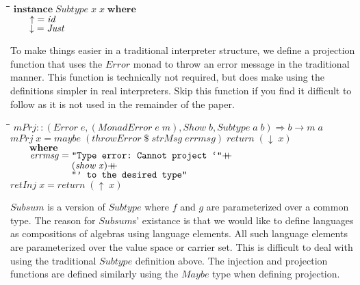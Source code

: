 \documentclass[11pt]{article}
\newlength{\lwidth}\setlength{\lwidth}{4.5cm}
\newlength{\cwidth}\setlength{\cwidth}{8mm} %
\newcommand{\Conid}[1]{\mathit{#1}}
\newcommand{\Varid}[1]{\mathit{#1}}
\newcommand{\plus}{\mathbin{+\!\!\!+}}
\begin{document}
\begin{tabbing}
\qquad\=\hspace{\lwidth}\=\hspace{\cwidth}\=\+\kill
${\mathbf{instance}\;\Conid{Subtype}\;\Varid{x}\;\Varid{x}\;\mathbf{where}}$\\
${\hskip2.00em\relax\Varid{\uparrow}\mathrel{=}\Varid{id}}$\\
${\hskip2.00em\relax\Varid{\downarrow}\mathrel{=}\Conid{Just}}$
\end{tabbing}
To make things easier in a traditional interpreter structure, we
define a projection function that uses the \ensuremath{\Conid{Error}} monad to throw an
error message in the traditional manner.  This function is technically
not required, but does make using the definitions simpler in real
interpreters.  Skip this function if you find it difficult to follow
as it is not used in the remainder of the paper.

\begin{tabbing}
\qquad\=\hspace{\lwidth}\=\hspace{\cwidth}\=\+\kill
${\Varid{mPrj}\mathbin{::}(\Conid{Error}\;\Varid{e},(\Conid{MonadError}\;\Varid{e}\;\Varid{m}),\Conid{Show}\;\Varid{b},\Conid{Subtype}\;\Varid{a}\;\Varid{b})\Rightarrow \Varid{b}\to \Varid{m}\;\Varid{a}}$\\
${\Varid{mPrj}\;\Varid{x}\mathrel{=}\Varid{maybe}\;(\Varid{throwError}\mathbin{\$}\Varid{strMsg}\;\Varid{errmsg})\;\Varid{return}\;(\Varid{\downarrow}\;\Varid{x})}$\\
${\hskip2.00em\relax\mathbf{where}}$\\
${\hskip2.00em\relax\Varid{errmsg}\mathrel{=}\text{\tt \char34 Type~error:~Cannot~project~`\char34}\plus }$\\
${\hskip2.00em\relax\phantom{\Varid{errmsg}\mathrel{=}\mbox{}}(\Varid{show}\;\Varid{x})\plus }$\\
${\hskip2.00em\relax\phantom{\Varid{errmsg}\mathrel{=}\mbox{}}\text{\tt \char34 '~to~the~desired~type\char34}}$\\
${}$\\
${\Varid{retInj}\;\Varid{x}\mathrel{=}\Varid{return}\;(\Varid{\uparrow}\;\Varid{x})}$
\end{tabbing}
\ensuremath{\Conid{Subsum}} is a version of \ensuremath{\Conid{Subtype}} where \ensuremath{\Varid{f}} and \ensuremath{\Varid{g}} are parameterized
 over a common type.  The reason for \ensuremath{\Conid{Subsum}}s' existance is that we
 would like to define languages as compositions of algebras using
 language elements.  All such language elements are parameterized over
 the value space or carrier set.  This is difficult to deal with using
 the traditional \ensuremath{\Conid{Subtype}} definition above.  The injection and
 projection functions are defined similarly using the \ensuremath{\Conid{Maybe}} type
 when defining projection.
\end{document}
